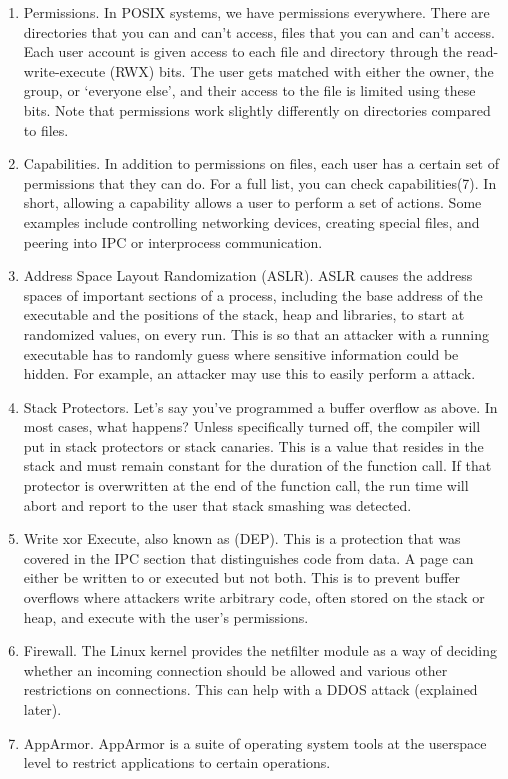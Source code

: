 \begin{enumerate}
\item Permissions.
  In POSIX systems, we have permissions everywhere.
  There are directories that you can and can't access, files that you can and can't access.
  Each user account is given access to each file and directory through the read-write-execute (RWX) bits.
  The user gets matched with either the owner, the group, or `everyone else', and their access to the file is limited using these bits.
  Note that permissions work slightly differently on directories compared to files.
\item Capabilities.
  In addition to permissions on files, each user has a certain set of permissions that they can do.
  For a full list, you can check capabilities(7).
  In short, allowing a capability allows a user to perform a set of actions.
  Some examples include controlling networking devices, creating special files, and peering into IPC or interprocess communication.
\item Address Space Layout Randomization (ASLR).
  ASLR causes the address spaces of important sections of a process, including the base address of the executable and the positions of the stack, heap and libraries, to start at randomized values, on every run.
  This is so that an attacker with a running executable has to randomly guess where sensitive information could be hidden.
  For example, an attacker may use this to easily perform a  attack.
\item Stack Protectors.
  Let's say you've programmed a buffer overflow as above.
  In most cases, what happens?
  Unless specifically turned off, the compiler will put in stack protectors or stack canaries. This is a value that resides in the stack and must remain constant for the duration of the function call. If that protector is overwritten at the end of the function call, the run time will abort and report to the user that stack smashing was detected.
\item Write xor Execute, also known as  (DEP).
  This is a protection that was covered in the IPC section that distinguishes code from data.
  A page can either be written to or executed but not both.
  This is to prevent buffer overflows where attackers write arbitrary code, often stored on the stack or heap, and execute with the user's permissions.
\item Firewall.
  The Linux kernel provides the netfilter module as a way of deciding whether an incoming connection should be allowed and various other restrictions on connections.
  This can help with a DDOS attack (explained later).
\item AppArmor.
  AppArmor is a suite of operating system tools at the userspace level to restrict applications to certain operations.
\end{enumerate}

